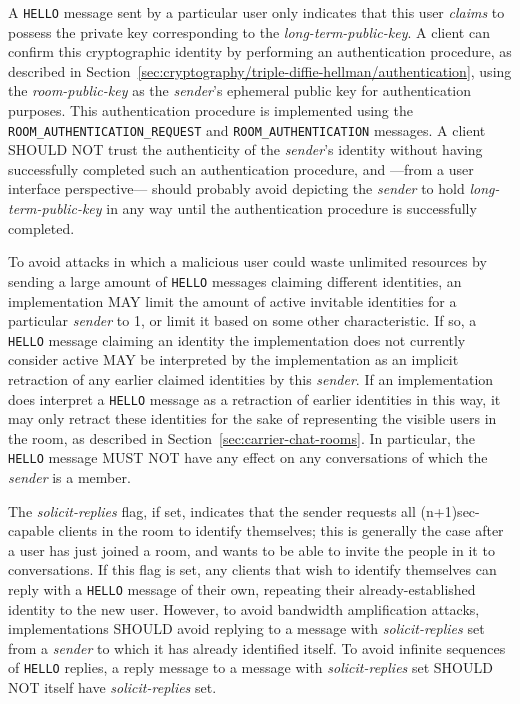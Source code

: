 \documentclass{article}
\def\npmessage#1{\texttt{#1}}
\def\field#1{\textit{#1}}
\begin{document}
A \npmessage{HELLO} message sent by a particular user only indicates that this user \emph{claims} to possess the private key corresponding to the \field{long-term-public-key}.
A client can confirm this cryptographic identity by performing an authentication procedure, as described in Section~\ref{sec:cryptography/triple-diffie-hellman/authentication}, using the \field{room-public-key} as the \field{sender}'s ephemeral public key for authentication purposes.
This authentication procedure is implemented using the \npmessage{ROOM\_AUTHENTICATION\_REQUEST} and \npmessage{ROOM\_AUTHENTICATION} messages.
A client SHOULD NOT trust the authenticity of the \field{sender}'s identity without having successfully completed such an authentication procedure, and ---from a user interface perspective--- should probably avoid depicting the \field{sender} to hold \field{long-term-public-key} in any way until the authentication procedure is successfully completed.

To avoid attacks in which a malicious user could waste unlimited resources by sending a large amount of \npmessage{HELLO} messages claiming different identities, an implementation MAY limit the amount of active invitable identities for a particular \field{sender} to 1, or limit it based on some other characteristic.
If so, a \npmessage{HELLO} message claiming an identity the implementation does not currently consider active MAY be interpreted by the implementation as an implicit retraction of any earlier claimed identities by this \field{sender}.
If an implementation does interpret a \npmessage{HELLO} message as a retraction of earlier identities in this way, it may only retract these identities for the sake of representing the visible users in the room, as described in Section~\ref{sec:carrier-chat-rooms}.
In particular, the \npmessage{HELLO} message MUST NOT have any effect on any conversations of which the \field{sender} is a member.

The \field{solicit-replies} flag, if set, indicates that the sender requests all (n+1)sec-capable clients in the room to identify themselves; this is generally the case after a user has just joined a room, and wants to be able to invite the people in it to conversations.
If this flag is set, any clients that wish to identify themselves can reply with a \npmessage{HELLO} message of their own, repeating their already-established identity to the new user.
However, to avoid bandwidth amplification attacks, implementations SHOULD avoid replying to a message with \field{solicit-replies} set from a \field{sender} to which it has already identified itself.
To avoid infinite sequences of \npmessage{HELLO} replies, a reply message to a message with \field{solicit-replies} set SHOULD NOT itself have \field{solicit-replies} set.
\end{document}
